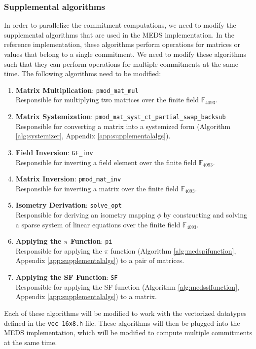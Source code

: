 \documentclass[11pt,a4paper]{report}
\theoremstyle{definition}
\begin{document}
\subsubsection{Supplemental algorithms}
\label{sec:suppalgorithmsparallelization}
In order to parallelize the commitment computations, we need to modify the supplemental algorithms that are used in the MEDS implementation. In the reference implementation, these algorithms perform operations for matrices or values that belong to a single commitment. We need to modify these algorithms such that they can perform operations for multiple commitments at the same time. The following algorithms need to be modified:
\begin{enumerate}
  \item \textbf{Matrix Multiplication}: \texttt{pmod\_mat\_mul}\\
  Responsible for multiplying two matrices over the finite field $\mathbb{F}_{4093}$.
  \item \textbf{Matrix Systemization}: \texttt{pmod\_mat\_syst\_ct\_partial\_swap\_backsub}\\
  Responsible for converting a matrix into a systemized form (Algorithm \ref{alg:systemizer}, Appendix \ref{app:supplementalalgs}).
  \item \textbf{Field Inversion}: \texttt{GF\_inv}\\
  Responsible for inverting a field element over the finite field $\mathbb{F}_{4093}$.
  \item \textbf{Matrix Inversion}: \texttt{pmod\_mat\_inv}\\
  Responsible for inverting a matrix over the finite field $\mathbb{F}_{4093}$.
  \item \textbf{Isometry Derivation}: \texttt{solve\_opt}\\
  Responsible for deriving an isometry mapping $\phi$ by constructing and solving a sparse system of linear equations over the finite field $\mathbb{F}_{4093}$.
  \item \textbf{Applying the $\pi$ Function}: \texttt{pi}\\
  Responsible for applying the $\pi$ function (Algorithm \ref{alg:medspifunction}, Appendix \ref{app:supplementalalgs}) to a pair of matrices.
  \item \textbf{Applying the SF Function}: \texttt{SF}\\
  Responsible for applying the SF function (Algorithm \ref{alg:medssffunction}, Appendix \ref{app:supplementalalgs}) to a matrix.
\end{enumerate}
Each of these algorithms will be modified to work with the vectorized datatypes defined in the \texttt{vec\_16x8.h} file. These algorithms will then be plugged into the MEDS implementation, which will be modified to compute multiple commitments at the same time.
\end{document}
